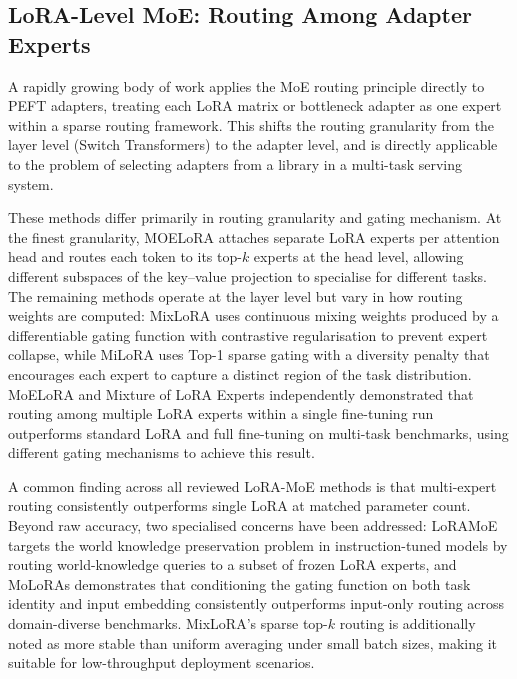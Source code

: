\subsection{LoRA-Level MoE: Routing Among Adapter Experts}
\label{sec:moe_routing:lora_moe}

A rapidly growing body of work applies the MoE routing principle directly to PEFT
adapters, treating each LoRA matrix or bottleneck adapter as one expert within a
sparse routing framework. This shifts the routing granularity from the layer level
(Switch Transformers) to the adapter level, and is directly applicable to the problem
of selecting adapters from a library in a multi-task serving system.

These methods differ primarily in routing granularity and gating mechanism.
At the finest granularity, MOELoRA \citep{LiuMOELoRA2023} attaches separate LoRA experts
per attention head and routes each token to its top-$k$ experts at the head level,
allowing different subspaces of the key--value projection to specialise for different tasks.
The remaining methods operate at the layer level but vary in how routing weights are
computed: MixLoRA \citep{LiMixLoRA2024} uses continuous mixing weights produced by a
differentiable gating function with contrastive regularisation to prevent expert collapse,
while MiLoRA \citep{ZhangMiLoRA2024} uses Top-1 sparse gating with a diversity penalty
that encourages each expert to capture a distinct region of the task distribution.
MoELoRA \citep{LuoMoELoRA2024} and Mixture of LoRA Experts \citep{WuMixtureLoRA2024}
independently demonstrated that routing among multiple LoRA experts within a single
fine-tuning run outperforms standard LoRA and full fine-tuning on multi-task benchmarks,
using different gating mechanisms to achieve this result.

A common finding across all reviewed LoRA-MoE methods is that multi-expert routing
consistently outperforms single LoRA at matched parameter count. Beyond raw accuracy,
two specialised concerns have been addressed: LoRAMoE \citep{DouLoRAMoE2024} targets the
world knowledge preservation problem in instruction-tuned models by routing
world-knowledge queries to a subset of frozen LoRA experts, and MoLoRAs
\citep{FengMoLoRAs2024} demonstrates that conditioning the gating function on both task
identity and input embedding consistently outperforms input-only routing across
domain-diverse benchmarks. MixLoRA's sparse top-$k$ routing is additionally noted as
more stable than uniform averaging under small batch sizes, making it suitable for
low-throughput deployment scenarios.

